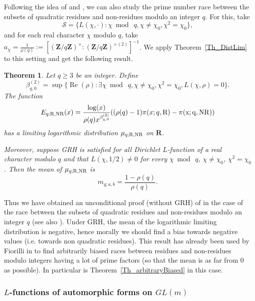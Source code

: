 \documentclass[a4paper,10pt]{amsart}
\theoremstyle{plain}
\newtheorem{theo}{Theorem}[section]
\theoremstyle{definition}
\begin{document}
Following the idea of \cite{RS} and \cite{Fiorilli_HighlyBiased}, 
we can also study the prime number race between the subsets of quadratic residues and non-residues modulo an integer $q$. 
For this, take
$$\mathcal{S}= \lbrace L(\chi,\cdot) : \chi \bmod\ q, \chi\neq \chi_{0}, \chi^{2} = \chi_{0}\rbrace,$$
and for each real character $\chi$ modulo $q$, take $a_{\chi}=\frac{1}{\rho(q)} := [(\mathbf{Z}/q\mathbf{Z})^{\times} : (\mathbf{Z}/q\mathbf{Z})^{\times (2)}]^{-1}$.
We apply Theorem~\ref{Th_DistLim} to this setting and get the following result.
\begin{theo}
Let $q\geq 3$ be an integer.
Define $$\beta^{(2)}_{q,0} = \sup\lbrace \operatorname{Re}(\rho) : \exists \chi \bmod\ q, \chi\neq \chi_{0}, \chi^{2} = \chi_{0},  L(\chi,\rho)=0\rbrace.$$
The function
$$E_{q;\rm{R},\rm{NR}}(x) = \frac{\log(x)}{\rho(q)x^{\beta^{(2)}_{q,0}}}((\rho(q) -1)\pi(x;q,\rm{R}) -\pi(x;q,\rm{NR}))$$
has a limiting logarithmic distribution $\mu_{q;\rm{R},\rm{NR}}$ on $\mathbf{R}$.

Moreover, suppose GRH is satisfied for all Dirichlet $L$-function of a real character modulo $q$
and that $L(\chi,1/2)\neq 0$ for every $\chi \bmod\ q$, $\chi\neq \chi_{0}$, $\chi^{2}=\chi_{0}$.
Then the mean of $\mu_{q;\rm{R},\rm{NR}}$ is
$$m_{q;a,b} = \frac{1 -\rho(q)}{\rho(q)}.$$
\end{theo}

Thus we have obtained an unconditional proof (without GRH) of \cite[Th. 1.1]{RS} in the case of the race  between the subsets of quadratic residues and non-residues modulo an integer $q$  (see also \cite[Lem. 2.2]{Fiorilli_HighlyBiased}).
Under GRH, the mean of the logarithmic limiting distribution is negative, 
hence morally we should find a bias towards negative values (i.e. towards non quadratic residues).
This result has already been used by Fiorilli in \cite{Fiorilli_HighlyBiased} to find arbitrarily biased races between residues and non-residues modulo integers having a lot of prime factors (so that the mean is as far from $0$ as possible).
In particular \cite[Th. 1.2]{Fiorilli_HighlyBiased} is Theorem~\ref{Th_arbitraryBiased} in this case.

\subsubsection{$L$-functions of automorphic forms on $GL(m)$}
\end{document}
